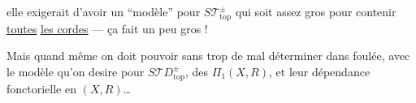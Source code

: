 elle exigerait d'avoir un ``modèle'' pour $S\mathcal T_{\mathrm{top}}^\pm$ qui soit assez gros pour contenir  \uline{toutes} \uline{les cordes} --- ça fait un peu gros !

Mais quand même on doit pouvoir sans trop de mal déterminer dans  foulée, avec le modèle qu'on desire pour $S\mathcal TD_{\mathrm{top}}^\pm$, des  $\Pi_1(X,R)$, et leur dépendance fonctorielle en $(X,R)$\ldots
{}
